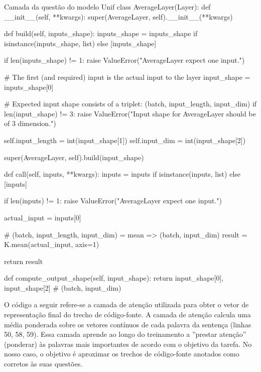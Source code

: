 \begin{mypython-linenumber}{Camada da questão do modelo Unif}
class AverageLayer(Layer):
    def __init__(self, **kwargs):
        super(AverageLayer, self).__init__(**kwargs)

    def build(self, inputs_shape):
        inputs_shape = inputs_shape if isinstance(inputs_shape, list) else [inputs_shape]

        if len(inputs_shape) != 1:
            raise ValueError("AverageLayer expect one input.")

        # The first (and required) input is the actual input to the layer
        input_shape = inputs_shape[0]

        # Expected input shape consists of a triplet: (batch, input_length, input_dim)
        if len(input_shape) != 3:
            raise ValueError("Input shape for AverageLayer should be of 3 dimension.")

        self.input_length = int(input_shape[1])
        self.input_dim = int(input_shape[2])

        super(AverageLayer, self).build(input_shape)

    def call(self, inputs, **kwargs):
        inputs = inputs if isinstance(inputs, list) else [inputs]

        if len(inputs) != 1:
            raise ValueError("AverageLayer expect one input.")

        actual_input = inputs[0]

        # (batch, input_length, input_dim) = mean => (batch, input_dim)
        result = K.mean(actual_input, axis=1)

        return result

    def compute_output_shape(self, input_shape):
        return input_shape[0], input_shape[2] # (batch, input_dim)
\end{mypython-linenumber}

\vspace{2cm}

O código a seguir refere-se a camada de atenção utilizada para obter o vetor de representação final do trecho de código-fonte. A camada de atenção calcula uma média ponderada sobre os vetores contínuos de cada palavra da sentença (linhas 50, 58, 59). Essa camada aprende ao longo do treinamento a ''prestar atenção'' (ponderar) às palavras mais importantes de acordo com o objetivo da tarefa. No nosso caso, o objetivo é aproximar os trechos de código-fonte anotados como corretos às suas questões.

